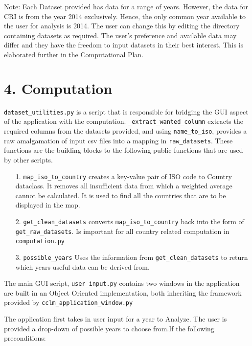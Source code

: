 \documentclass[fontsize=11pt]{article}
\begin{document}
    Note: Each Dataset provided has data for a range of years. However, the data for CRI is from the year 2014 exclusively. Hence, the only common year available to the user for analysis is 2014. The user can change this by editing the directory containing datasets as required. The user’s preference and available data may differ and they have the freedom to input datasets in their best interest. This is elaborated further in the Computational Plan.


    \section*{4. Computation}
    
    \texttt{dataset\_utilities.py} is a script that is responsible for bridging the GUI aspect of the application with the computation. \texttt{\_extract\_wanted\_column} extracts the required columns from the datasets provided, and using \texttt{name\_to\_iso}, provides a raw amalgamation of input csv files into a mapping in \texttt{raw\_datasets}. These functions are the building blocks to the following public functions that are used by other scripts.
    
    \begin{enumerate}
    	\item [1.] \texttt{map\_iso\_to\_country} creates a key-value pair of ISO code to Country dataclass. It removes all insufficient data from which a weighted average cannot be calculated. It is used to find all the countries that are to be displayed in the map.
    	
    	\item[2.] \texttt{get\_clean\_datasets} converts \texttt{map\_iso\_to\_country} back into the form of \texttt{get\_raw\_datasets}. Is important for all country related computation in \texttt{computation.py}
    	
    	\item[3.] \texttt{possible\_years} Uses the information from \texttt{get\_clean\_datasets} to return which years useful data can be derived from.
    \end{enumerate}

	The main GUI script, \texttt{user\_input.py} contains two windows in the application are built in an Object Oriented implementation, both inheriting the framework provided by \texttt{cclm\_application\_window.py}\newline

    The application first takes in user input for a year to Analyze. The user is provided a drop-down of
    possible years to choose from.\newline If the following preconditions:
\end{document}
